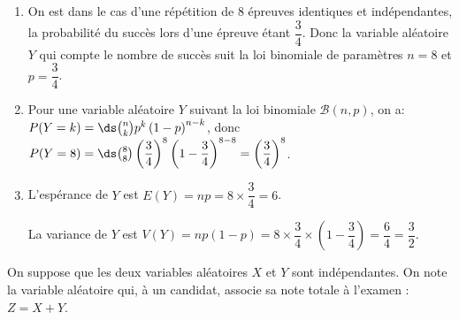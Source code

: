\begin{enumerate}
\item%
On est dans le cas d'une répétition de 8 épreuves identiques et indépendantes, la probabilité du succès lors d'une épreuve étant $\dfrac{3}{4}$. Donc la variable aléatoire $Y$ qui compte le nombre de succès suit la loi binomiale de paramètres $n=8$ et $p=\dfrac{3}{4}$.

\item %
Pour une variable aléatoire $Y$ suivant la loi binomiale $\mathcal{B}(n,p)$, on a:\\
$P(Y=k)=\ds\binom{n}{k} p^k \left (1-p\right )^{n-k}$, 
donc $P(Y=8)=\ds\binom{8}{8} \left (\dfrac{3}{4}\right )^{8}\left (1-\dfrac{3}{4}\right )^{8-8}
= \left (\dfrac{3}{4}\right )^8$.

\item L'espérance de $Y$ est $E(Y)= np = 8\times \dfrac{3}{4}= 6$.

La variance de $Y$ est $V(Y)= np(1 - p) = 8\times \dfrac{3}{4}\times \left (1 - \dfrac{3}{4}\right )=\dfrac{6}{4}= \dfrac{3}{2}$.
\end{enumerate}

\medskip


\medskip



On suppose que les deux variables aléatoires $X$ et $Y$ sont indépendantes. On note la variable aléatoire qui, à un candidat, associe sa note totale à l'examen : $Z = X + Y$.


